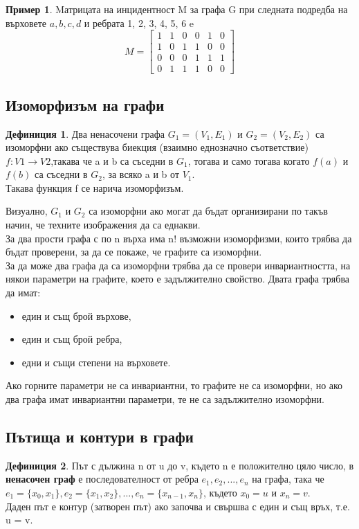 \documentclass[fleqn, 12pt]{article}
\theoremstyle{definition}
\newtheorem{example}{Пример}[subsection]
\newtheorem{definition}{Дефиниция}[subsection]
\begin{document}
\begin{example}
Mатрицата на инцидентност M за графа G при следната подредба на върховете $a, b, c, d$ и ребрата 1, 2, 3, 4, 5, 6 e \\
$$
M = 
\begin{bmatrix}
1 & 1 & 0 & 0 & 1 & 0\\
1 & 0 & 1 & 1 & 0 & 0\\
0 & 0 & 0 & 1 & 1 & 1\\
0 & 1 & 1 & 1 &0 & 0
\end{bmatrix}
$$
\end{example}

\subsection{Изоморфизъм на графи}
\begin{definition}
Два ненасочени графа $G_1= (V_1, E_1)$ и $G_2= (V_2, E_2)$ са изоморфни ако съществува биекция (взаимно еднозначно съответствие) $f:V1 \to V2$,такава че a и b са съседни в $G_1$, тогава и само тогава когато $f(a)$ и $f(b)$ са съседни в $G_2$, за всяко a и b от $V_1$. \\
Такава функция f се нарича изоморфизъм.
\end{definition}
Визуално, $G_1$ и $G_2$ са изоморфни ако могат да бъдат организирани по такъв начин, че техните изображения да са еднакви. \\
За два прости графа с по n върха има n! възможни изоморфизми, които трябва да бъдат проверени, за да се покаже, че графите са изоморфни.\\
За да може два графа да са изоморфни трябва да се провери инвариантността, на някои параметри на графите, което е задължително свойство. Двата графа трябва да имат:
\begin{itemize}
\item един и същ брой върхове,
\item един и същ брой ребра, 
\item едни и същи степени на върховете.
\end{itemize}
Ако  горните параметри не са инвариантни, то графите не са изоморфни, но ако два графа имат инвариантни параметри, те не са задължително изоморфни.

\subsection{Пътища и контури в графи}
\begin{definition}
Път с дължина n от u до v, където n е положително цяло число, в \textbf{ненасочен граф} е последователност от ребра $e_1, e_2, ..., e_n$ на графа, така че $e_1= \{x_0, x_1\}, e_2= \{x_1, x_2\}, ..., e_n= \{x_{n-1}, x_n\}$, където $x_0= u$ и $x_n= v$.\\
Даден път е контур (затворен път) ако започва и свършва с един и същ връх, т.е. u = v. 
\end{definition}
\end{document}

